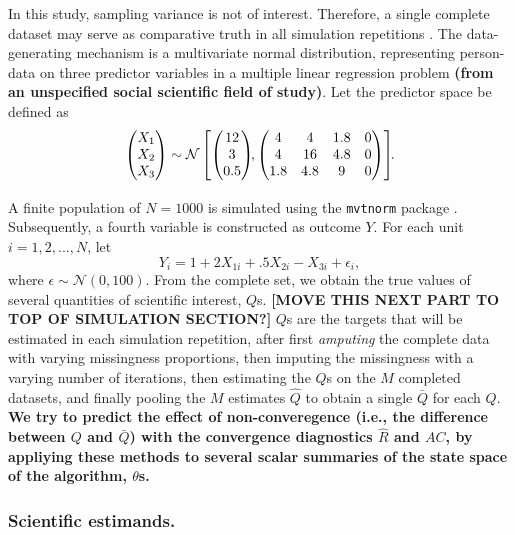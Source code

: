 \documentclass[Royal,times,sageh]{sagej}
\begin{document}
In this study, sampling variance is not of interest. Therefore, a single
complete dataset may serve as comparative truth in all simulation
repetitions \citep{vink14}. The data-generating mechanism is a
multivariate normal distribution, representing person-data on three
predictor variables in a multiple linear regression problem
\textbf{(from an unspecified social scientific field of study)}. Let the
predictor space be defined as \[
\begin{aligned}
\begin{pmatrix}X_1\\
X_2\\
X_3
\end{pmatrix} \sim \mathcal{N}
\begin{bmatrix}
\begin{pmatrix}
12\\
3\\
0.5
\end{pmatrix}\!\!,
\begin{pmatrix}
4 & 4 & 1.8 & 0\\
4 & 16 & 4.8 & 0\\
1.8 & 4.8 & 9 & 0
\end{pmatrix}
\end{bmatrix}\!\!\text{.}\\[2\jot]
\end{aligned}
\] A finite population of \(N=1000\) is simulated using the
\texttt{mvtnorm} package \citep{mvtnorm}. Subsequently, a fourth
variable is constructed as outcome \(Y\). For each unit
\(i = 1, 2,..., N\), let \[
Y_i = 1 + 2X_{1i} +.5X_{2i} - X_{3i} + \epsilon_i ,
\] where \(\epsilon \sim \mathcal{N}(0, 100)\). From the complete set,
we obtain the true values of several quantities of scientific interest,
\(Q\)s. \textbf{{[}MOVE THIS NEXT PART TO TOP OF SIMULATION SECTION?{]}}
\(Q\)s are the targets that will be estimated in each simulation
repetition, after first \emph{amputing} the complete data with varying
missingness proportions, then imputing the missingness with a varying
number of iterations, then estimating the \(Q\)s on the \(M\) completed
datasets, and finally pooling the \(M\) estimates \(\hat{Q}\) to obtain
a single \(\bar{Q}\) for each \(Q\). \textbf{We try to predict the
effect of non-converegence (i.e., the difference between \(Q\) and
\(\bar{Q}\)) with the convergence diagnostics \(\widehat{R}\) and
\(AC\), by appliying these methods to several scalar summaries of the
state space of the algorithm, \(\theta\)s.}

\hypertarget{scientific-estimands.}{%
\subsubsection{Scientific estimands.}\label{scientific-estimands.}}
\end{document}
